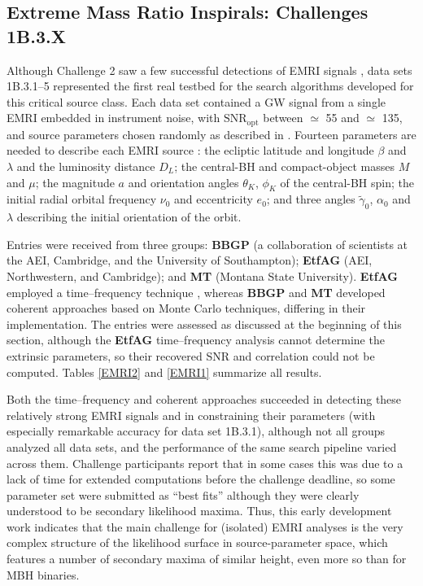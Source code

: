 \documentclass{iopart}
\begin{document}
\subsection{Extreme Mass Ratio Inspirals: Challenges 1B.3.X}

Although Challenge 2 saw a few successful detections of EMRI signals \cite{mldcamaldi2}, data sets 1B.3.1--5 represented the first real testbed for the search algorithms developed for this critical source class. Each data set contained a GW signal from a single EMRI embedded in instrument noise, with $\mathrm{SNR}_\mathrm{opt}$ between $\simeq$ 55 and $\simeq$ 135, and source parameters chosen randomly as described in \cite{mldcgwdaw2}. Fourteen parameters are needed to describe each EMRI source \cite{mldcgwdaw2}: 
the ecliptic latitude and longitude $\beta$ and $\lambda$ and the luminosity distance $D_L$; the central-BH and compact-object masses $M$ and $\mu$;  the magnitude $a$ and orientation angles $\theta_K$, $\phi_K$ of the central-BH spin; the initial radial orbital frequency $\nu_0$ and eccentricity $e_0$; and three angles $\tilde{\gamma}_0$, $\alpha_0$ and $\lambda$ describing the initial orientation of the orbit.

Entries were received from three groups: \textbf{BBGP} (a collaboration of scientists at the AEI, Cambridge, and the University of Southampton); \textbf{EtfAG} (AEI, Northwestern, and Cambridge); and \textbf{MT} (Montana State University).
\textbf{EtfAG} employed a time--frequency technique \cite{gmw}, whereas \textbf{BBGP} \cite{bbgpemri} and \textbf{MT} \cite{cornishemri} developed coherent approaches based on Monte Carlo techniques, differing in their implementation.
The entries were assessed as discussed at the beginning of this section, although the \textbf{EtfAG} time--frequency analysis cannot determine the extrinsic parameters, so their recovered SNR and correlation could not be computed. Tables \ref{EMRI2} and \ref{EMRI1} summarize all results.

Both the time--frequency and coherent approaches succeeded in detecting these relatively strong EMRI signals and in constraining their parameters (with especially remarkable accuracy for data set 1B.3.1), although not all groups analyzed all data sets, and the performance of the same search pipeline varied across them. Challenge participants report that in some cases this was due to a lack of time for extended computations before the challenge deadline, so some parameter set were submitted as ``best fits'' although they were clearly understood to be secondary likelihood maxima. Thus, this early development work indicates that the main challenge for (isolated) EMRI analyses is the very complex structure of the likelihood surface in source-parameter space, which features a number of secondary maxima of similar height, even more so than for MBH binaries.
\end{document}
